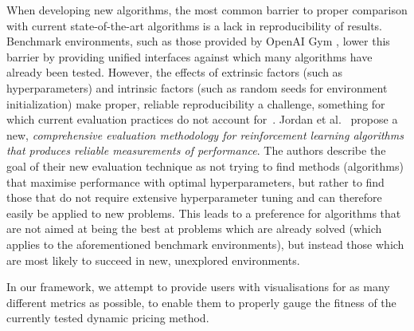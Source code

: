 When developing new algorithms, the most common barrier to proper comparison with current state-of-the-art algorithms is a lack in reproducibility of results. Benchmark environments, such as those provided by OpenAI Gym \cite{OpenAIGym}, lower this barrier by providing unified interfaces against which many algorithms have already been tested. However, the effects of extrinsic factors (such as hyperparameters) and intrinsic factors (such as random seeds for environment initialization) make proper, reliable reproducibility a challenge, something for which current evaluation practices do not account for~\cite{DRLThatMatters}. Jordan et al.~\cite{EvaluatingPerformance} propose a new, \emph{comprehensive evaluation methodology for reinforcement learning algorithms that produces reliable measurements of performance}. The authors describe the goal of their new evaluation technique as not trying to find methods (algorithms) that maximise performance with optimal hyperparameters, but rather to find those that do not require extensive hyperparameter tuning and can therefore easily be applied to new problems. This leads to a preference for algorithms that are not aimed at being the best at problems which are already solved (which applies to the aforementioned benchmark environments), but instead those which are most likely to succeed in new, unexplored environments.

In our framework, we attempt to provide users with visualisations for as many different metrics as possible, to enable them to properly gauge the fitness of the currently tested dynamic pricing method.